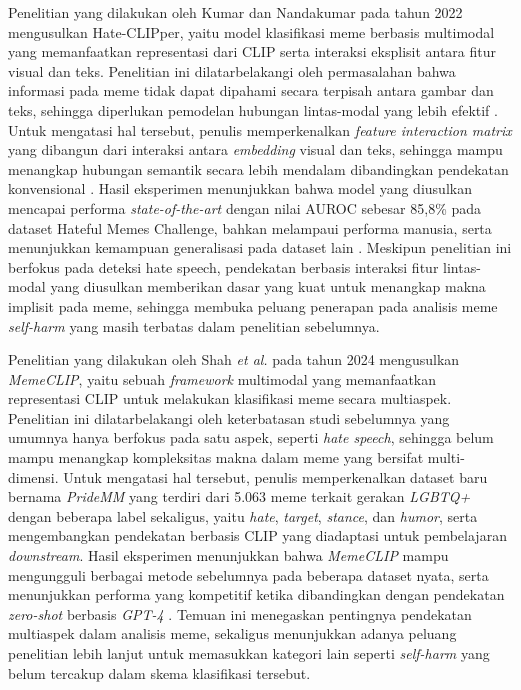 Penelitian yang dilakukan oleh Kumar dan Nandakumar pada tahun 2022 mengusulkan Hate-CLIPper, yaitu model klasifikasi meme berbasis multimodal yang memanfaatkan representasi dari CLIP serta interaksi eksplisit antara fitur visual dan teks. Penelitian ini dilatarbelakangi oleh permasalahan bahwa informasi pada meme tidak dapat dipahami secara terpisah antara gambar dan teks, sehingga diperlukan pemodelan hubungan lintas-modal yang lebih efektif . Untuk mengatasi hal tersebut, penulis memperkenalkan \textit{feature interaction matrix} yang dibangun dari interaksi antara \textit{embedding}  visual dan teks, sehingga mampu menangkap hubungan semantik secara lebih mendalam dibandingkan pendekatan konvensional . Hasil eksperimen menunjukkan bahwa model yang diusulkan mencapai performa \textit{state-of-the-art} dengan nilai AUROC sebesar 85{,}8\% pada dataset Hateful Memes Challenge, bahkan melampaui performa manusia, serta menunjukkan kemampuan generalisasi pada dataset lain \cite{kumar2022hateclipper}. Meskipun penelitian ini berfokus pada deteksi hate speech, pendekatan berbasis interaksi fitur lintas-modal yang diusulkan memberikan dasar yang kuat untuk menangkap makna implisit pada meme, sehingga membuka peluang penerapan pada analisis meme \textit{self-harm} yang masih terbatas dalam penelitian sebelumnya.

Penelitian yang dilakukan oleh Shah \textit{et al.} pada tahun 2024 mengusulkan \textit{MemeCLIP}, yaitu sebuah \textit{framework} multimodal yang memanfaatkan representasi CLIP untuk melakukan klasifikasi meme secara multiaspek. Penelitian ini dilatarbelakangi oleh keterbatasan studi sebelumnya yang umumnya hanya berfokus pada satu aspek, seperti \textit{hate speech}, sehingga belum mampu menangkap kompleksitas makna dalam meme yang bersifat multi-dimensi. Untuk mengatasi hal tersebut, penulis memperkenalkan dataset baru bernama \textit{PrideMM} yang terdiri dari 5.063 meme terkait gerakan \textit{LGBTQ+} dengan beberapa label sekaligus, yaitu \textit{hate}, \textit{target}, \textit{stance}, dan \textit{humor}, serta mengembangkan pendekatan berbasis CLIP yang diadaptasi untuk pembelajaran \textit{downstream}. Hasil eksperimen menunjukkan bahwa \textit{MemeCLIP} mampu mengungguli berbagai metode sebelumnya pada beberapa dataset nyata, serta menunjukkan performa yang kompetitif ketika dibandingkan dengan pendekatan \textit{zero-shot} berbasis \textit{GPT-4} \cite{shah2024memeclip}. Temuan ini menegaskan pentingnya pendekatan multiaspek dalam analisis meme, sekaligus menunjukkan adanya peluang penelitian lebih lanjut untuk memasukkan kategori lain seperti \textit{self-harm} yang belum tercakup dalam skema klasifikasi tersebut.

